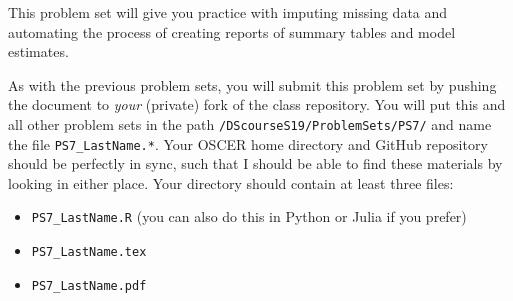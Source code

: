 \documentclass[12pt,english]{exam}
\begin{document}
This problem set will give you practice with imputing missing data and automating the process of creating reports of summary tables and model estimates.

As with the previous problem sets, you will submit this problem set by pushing the document to \emph{your} (private) fork of the class repository. You will put this and all other problem sets in the path \texttt{/DScourseS19/ProblemSets/PS7/} and name the file \texttt{PS7\_LastName.*}. Your OSCER home directory and GitHub repository should be perfectly in sync, such that I should be able to find these materials by looking in either place. Your directory should contain at least three files:
\begin{itemize}
    \item \texttt{PS7\_LastName.R} (you can also do this in Python or Julia if you prefer)
    \item \texttt{PS7\_LastName.tex}
    \item \texttt{PS7\_LastName.pdf}
\end{itemize}
\end{document}
